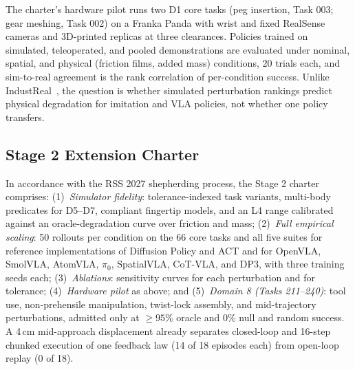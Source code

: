 \documentclass[conference]{IEEEtran}
\begin{document}
The charter's hardware pilot runs two D1 core tasks (peg insertion, Task 003; gear meshing, Task 002) on a Franka Panda with wrist and fixed RealSense cameras and 3D-printed replicas at three clearances. Policies trained on simulated, teleoperated, and pooled demonstrations are evaluated under nominal, spatial, and physical (friction films, added mass) conditions, 20 trials each, and sim-to-real agreement is the rank correlation of per-condition success. Unlike IndustReal~\cite{tang2023industreal}, the question is whether simulated perturbation rankings predict physical degradation for imitation and VLA policies, not whether one policy transfers.

\subsection{Stage 2 Extension Charter}
In accordance with the RSS 2027 shepherding process, the Stage 2 charter comprises:
(1)~\textit{Simulator fidelity}: tolerance-indexed task variants, multi-body predicates for D5--D7, compliant fingertip models, and an L4 range calibrated against an oracle-degradation curve over friction and mass;
(2)~\textit{Full empirical scaling}: 50 rollouts per condition on the 66 core tasks and all five suites for reference implementations of Diffusion Policy and ACT and for OpenVLA, SmolVLA, AtomVLA, $\pi_0$, SpatialVLA, CoT-VLA, and DP3, with three training seeds each;
(3)~\textit{Ablations}: sensitivity curves for each perturbation and for tolerance; (4)~\textit{Hardware pilot} as above; and
(5)~\textit{Domain 8 (Tasks 211--240)}: tool use, non-prehensile manipulation, twist-lock assembly, and mid-trajectory perturbations, admitted only at $\geq 95\%$ oracle and 0\% null and random success. A 4\,cm mid-approach displacement already separates closed-loop and 16-step chunked execution of one feedback law (14 of 18 episodes each) from open-loop replay (0 of 18).

\clearpage
{\footnotesize


}
\end{document}
